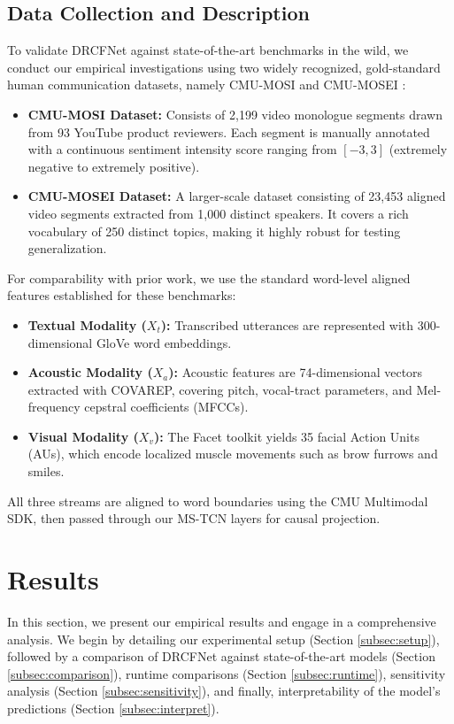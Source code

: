 \documentclass[sn-mathphys,Numbered]{sn-jnl}
\theoremstyle{thmstyleone}
\theoremstyle{thmstyletwo}
\theoremstyle{thmstylethree}
\begin{document}
\subsection{Data Collection and Description}\label{subsec:case_data}
To validate DRCFNet against state-of-the-art benchmarks in the wild, we conduct our empirical investigations using two widely recognized, gold-standard human communication datasets, namely CMU-MOSI \cite{zadeh2016mosi} and CMU-MOSEI \cite{zadeh2018multimodal}:
\begin{itemize}
    \item \textbf{CMU-MOSI Dataset:} Consists of 2,199 video monologue segments drawn from 93 YouTube product reviewers. Each segment is manually annotated with a continuous sentiment intensity score ranging from $[-3, 3]$ (extremely negative to extremely positive).
    \item \textbf{CMU-MOSEI Dataset:} A larger-scale dataset consisting of 23,453 aligned video segments extracted from 1,000 distinct speakers. It covers a rich vocabulary of 250 distinct topics, making it highly robust for testing generalization.
\end{itemize}
For comparability with prior work, we use the standard word-level aligned features established for these benchmarks:
\begin{itemize}
    \item \textbf{Textual Modality ($X_t$):} Transcribed utterances are represented with 300-dimensional GloVe word embeddings.
    \item \textbf{Acoustic Modality ($X_a$):} Acoustic features are 74-dimensional vectors extracted with COVAREP, covering pitch, vocal-tract parameters, and Mel-frequency cepstral coefficients (MFCCs).
    \item \textbf{Visual Modality ($X_v$):} The Facet toolkit yields 35 facial Action Units (AUs), which encode localized muscle movements such as brow furrows and smiles.
\end{itemize}
All three streams are aligned to word boundaries using the CMU Multimodal SDK, then passed through our MS-TCN layers for causal projection.

\section{Results}\label{sec:results}

In this section, we present our empirical results and engage in a comprehensive analysis. We begin by detailing our experimental setup (Section \ref{subsec:setup}), followed by a comparison of DRCFNet against state-of-the-art models (Section \ref{subsec:comparison}), runtime comparisons (Section \ref{subsec:runtime}), sensitivity analysis (Section \ref{subsec:sensitivity}), and finally, interpretability of the model's predictions (Section \ref{subsec:interpret}).
\end{document}
